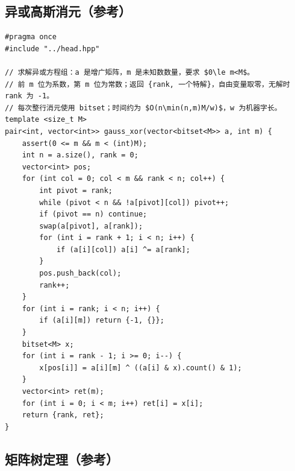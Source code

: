 \subsection{异或高斯消元（参考）}
\par

\begin{lstlisting}
#pragma once
#include "../head.hpp"

// 求解异或方程组：a 是增广矩阵，m 是未知数数量，要求 $0\le m<M$。
// 前 m 位为系数，第 m 位为常数；返回 {rank, 一个特解}，自由变量取零，无解时 rank 为 -1。
// 每次整行消元使用 bitset；时间约为 $O(n\min(n,m)M/w)$，w 为机器字长。
template <size_t M>
pair<int, vector<int>> gauss_xor(vector<bitset<M>> a, int m) {
    assert(0 <= m && m < (int)M);
    int n = a.size(), rank = 0;
    vector<int> pos;
    for (int col = 0; col < m && rank < n; col++) {
        int pivot = rank;
        while (pivot < n && !a[pivot][col]) pivot++;
        if (pivot == n) continue;
        swap(a[pivot], a[rank]);
        for (int i = rank + 1; i < n; i++) {
            if (a[i][col]) a[i] ^= a[rank];
        }
        pos.push_back(col);
        rank++;
    }
    for (int i = rank; i < n; i++) {
        if (a[i][m]) return {-1, {}};
    }
    bitset<M> x;
    for (int i = rank - 1; i >= 0; i--) {
        x[pos[i]] = a[i][m] ^ ((a[i] & x).count() & 1);
    }
    vector<int> ret(m);
    for (int i = 0; i < m; i++) ret[i] = x[i];
    return {rank, ret};
}
\end{lstlisting}

\subsection{矩阵树定理（参考）}
\par

